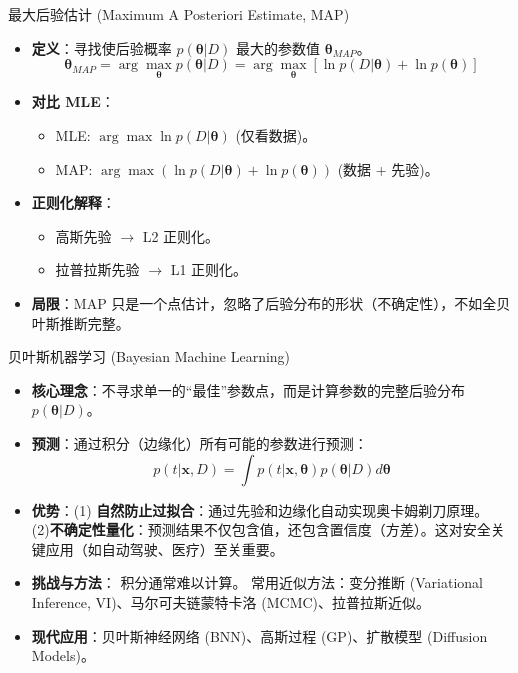 \documentclass[12pt, aspectratio=169]{beamer}
\newcommand{\vect}[1]{\mathbf{#1}}
\begin{document}
\begin{frame}{最大后验估计 (Maximum A Posteriori Estimate, MAP)}
    \begin{itemize}
        \item \textbf{定义}：寻找使后验概率 $p(\boldsymbol{\theta}|D)$ 最大的参数值 $\boldsymbol{\theta}_{MAP}$。
        $$ \boldsymbol{\theta}_{MAP} = \arg\max_{\boldsymbol{\theta}} p(\boldsymbol{\theta}|D) = \arg\max_{\boldsymbol{\theta}} [ \ln p(D|\boldsymbol{\theta}) + \ln p(\boldsymbol{\theta}) ] $$
        \item \textbf{对比 MLE}：
        \begin{itemize}
            \item MLE: $\arg\max \ln p(D|\boldsymbol{\theta})$ (仅看数据)。
            \item MAP: $\arg\max (\ln p(D|\boldsymbol{\theta}) + \ln p(\boldsymbol{\theta}))$ (数据 + 先验)。
        \end{itemize}
        \item \textbf{正则化解释}：
        \begin{itemize}
            \item 高斯先验 $\to$ L2 正则化。
            \item 拉普拉斯先验 $\to$ L1 正则化。
        \end{itemize}
        \item \textbf{局限}：MAP 只是一个点估计，忽略了后验分布的形状（不确定性），不如全贝叶斯推断完整。
    \end{itemize}
\end{frame}

\begin{frame}{贝叶斯机器学习 (Bayesian Machine Learning)}
    \begin{itemize}
        \item \textbf{核心理念}：不寻求单一的“最佳”参数点，而是计算参数的完整后验分布 $p(\boldsymbol{\theta}|D)$。
        \item \textbf{预测}：通过积分（边缘化）所有可能的参数进行预测：
        $$ p(t|\vect{x}, D) = \int p(t|\vect{x}, \boldsymbol{\theta}) p(\boldsymbol{\theta}|D) d\boldsymbol{\theta} $$
        \item \textbf{优势}：(1) \textbf{自然防止过拟合}：通过先验和边缘化自动实现奥卡姆剃刀原理。\\
        (2)\textbf{不确定性量化}：预测结果不仅包含值，还包含置信度（方差）。这对安全关键应用（如自动驾驶、医疗）至关重要。
        \item \textbf{挑战与方法}：
        积分通常难以计算。
        常用近似方法：变分推断 (Variational Inference, VI)、马尔可夫链蒙特卡洛 (MCMC)、拉普拉斯近似。
        \item \textbf{现代应用}：贝叶斯神经网络 (BNN)、高斯过程 (GP)、扩散模型 (Diffusion Models)。
    \end{itemize}
\end{frame}
\end{document}
